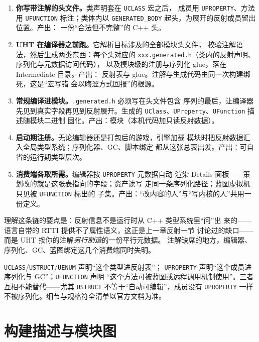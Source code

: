 \documentclass[12pt,a4paper,fontset=fandol]{ctexbook}
\newcommand{\Tp}[1]{\texttt{#1}}
\newcommand{\Bk}{\discretionary{}{}{}}
\newcommand{\Lang}[1]{\textsf{#1}}
\newcommand{\CPP}{\Lang{C++}}
\begin{document}
\begin{enumerate}
\item \textbf{你写带注解的头文件。}类声明套在 \Tp{UCLASS} 宏之后，
      成员用 \Tp{UPROPERTY}、方法用 \Tp{UFUNCTION} 标注；类体内以
      \Tp{GENERATED\_BODY} 起头，为展开的反射成员留出位置。产出：
      一份``合法但不完整''的 \CPP{} 头。
\item \textbf{UHT 在编译器之前跑。}它解析目标涉及的全部模块头文件，
      校验注解语法，然后生成两类东西：每个头对应的
      \Tp{xxx.generated.h}（类内的反射声明、序列化与元数据访问代码），
      以及模块级的注册与序列化 glue，落在 Intermediate 目录。产出：
      反射表与 glue。注解与生成代码由同一次构建绑死，这是``宏写错
      会以晦涩方式回报''的根源。
\item \textbf{常规编译进模块。}\Tp{.generated.h} 必须写在头文件包含
      序列的最后，让编译器先见到真实字段再见到反射展开。生成的
      \Tp{UClass}、\Tp{UProperty}、\Tp{UFunction} 描述随模块二进制
      固化。产出：模块（本机代码加只读反射数据）。
\item \textbf{启动期注册。}无论编辑器还是打包后的游戏，引擎加载
      模块时把反射数据汇入全局类型系统；序列化器、GC、脚本绑定
      都从这张总表出发。产出：可自省的运行期类型层次。
\item \textbf{消费端各取所需。}编辑器按 \Tp{UPROPERTY} 元数据自动
      渲染 Details 面板——策划改的就是这张表指向的字段；资产读写
      走同一条序列化路径；蓝图虚拟机只见被 \Tp{UFUNCTION} 标出的
      子集。产出：``改内容的人''与``写内核的人''共用一份定义。
\end{enumerate}

理解这条链的要点是：反射信息不是运行时从 \CPP{} 类型系统里``问''出
来的——语言自带的 RTTI 提供不了属性语义，这正是上一章反射一节
讨论过的缺口——而是 UHT 按你的注解\emph{另行制造}的一份平行元数据。
注解缺席的地方，编辑器、序列化、GC、蓝图绑定这几个消费端同时失明。

\begin{note}[title={注解族的分工，一句话版}]
\Tp{UCLASS}/{\Bk}\Tp{USTRUCT}/{\Bk}\Tp{UENUM} 声明``这个类型进反射表''；
\Tp{UPROPERTY} 声明``这个成员进序列化与 GC''；\Tp{UFUNCTION} 声明
``这个方法可被蓝图或远程调用机制使用''。三者互相不能替代——尤其
\Tp{USTRUCT} 不等于``自动可编辑''，成员没有 \Tp{UPROPERTY} 一样
不被序列化。细节与规格符全清单以官方文档为准。
\end{note}

\section{构建描述与模块图}
\label{sec:ch10-build-modules}
\end{document}
